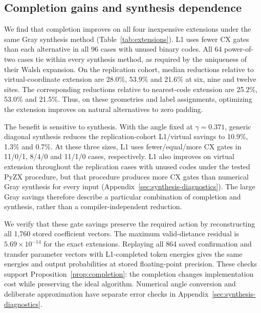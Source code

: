 \subsection{Completion gains and synthesis dependence}
We find that completion improves on all four inexpensive extensions under
the same Gray synthesis method (Table~\ref{tab:extensions}). L1 uses fewer CX gates
than each alternative in all 96 cases with unused binary codes. All 64
power-of-two cases tie within every synthesis method, as required by the
uniqueness of their Walsh expansion. On the replication cohort, median
reductions relative to virtual-coordinate extension are 28.0\%, 53.9\% and
21.6\% at six, nine and twelve sites. The corresponding reductions relative
to nearest-code extension are 25.2\%, 53.0\% and 21.5\%.
Thus, on these geometries and label assignments, optimizing the extension
improves on natural alternatives to zero padding.

\begin{table}[t]\centering\small\setlength{\tabcolsep}{3pt}
\caption{Exact extensions under symbolic Gray synthesis. The initial
100-case and replication 60-case cohorts contain 20 and 12 geometries per
site count, respectively. CX counts are medians with interquartile ranges.
Percentage changes are medians of paired L1/reference changes, not ratios
of the displayed medians; negative values favor L1. Power-of-two controls
are omitted because all extensions coincide.}
\label{tab:extensions}
\end{table}

The benefit is sensitive to synthesis. With the angle fixed at
$\gamma=0.371$, generic diagonal synthesis reduces the replication-cohort
L1/virtual savings to 10.9\%, 1.3\% and 0.7\%. At these three sizes, L1
uses fewer/equal/more CX gates in 11/0/1, 8/4/0 and 11/1/0 cases,
respectively. L1 also improves on virtual extension throughout the
replication cases with unused codes under the tested PyZX procedure, but
that procedure produces more CX gates than numerical Gray synthesis for
every input (Appendix~\ref{sec:synthesis-diagnostics}). The large Gray
savings therefore describe a particular combination of completion and
synthesis, rather than a compiler-independent reduction.

We verify that these gate savings preserve the required action by
reconstructing all 1,760 stored coefficient vectors. The maximum
valid-distance residual is $5.69\times10^{-14}$ for the exact extensions. Replaying all 864 saved
confirmation and transfer parameter vectors with L1-completed token
energies gives the same energies and output probabilities at stored
floating-point precision. These checks support
Proposition~\ref{prop:completion}: the completion changes implementation
cost while preserving the ideal algorithm. Numerical angle conversion
and deliberate approximation have separate error checks in
Appendix~\ref{sec:synthesis-diagnostics}.
